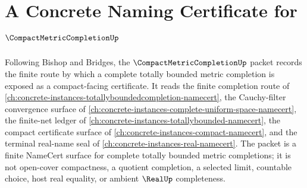 \chapter{A Concrete Naming Certificate for $\CompactMetricCompletionUp$}
\label{ch:concrete-instances-compact-metric-completion-namecert}

Following Bishop and Bridges, the $\CompactMetricCompletionUp$ packet records the finite route by which a complete totally bounded metric completion is exposed as a compact-facing certificate. It reads the finite completion route of \autoref{ch:concrete-instances-totallyboundedcompletion-namecert}, the Cauchy-filter convergence surface of \autoref{ch:concrete-instances-complete-uniform-space-namecert}, the finite-net ledger of \autoref{ch:concrete-instances-totallybounded-namecert}, the compact certificate surface of \autoref{ch:concrete-instances-compact-namecert}, and the terminal real-name seal of \autoref{ch:concrete-instances-real-namecert}. The packet is a finite NameCert surface for complete totally bounded metric completions; it is not open-cover compactness, a quotient completion, a selected limit, countable choice, host real equality, or ambient $\RealUp$ completeness.

